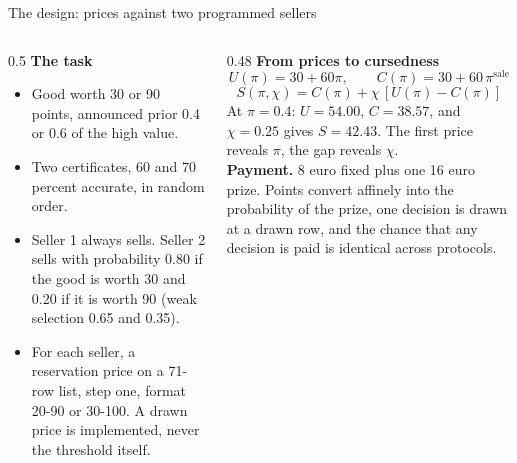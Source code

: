 \documentclass[aspectratio=169,11pt]{beamer}
\begin{document}
\begin{frame}{The design: prices against two programmed sellers}
\begin{columns}
\begin{column}{0.5\textwidth}
\textbf{The task}
\begin{itemize}
\item Good worth 30 or 90 points, announced prior 0.4 or 0.6 of the high value.
\item Two certificates, 60 and 70 percent accurate, in random order.
\item Seller 1 always sells. Seller 2 sells with probability 0.80 if the good is worth 30 and 0.20 if it is worth 90 (weak selection 0.65 and 0.35).
\item For each seller, a reservation price on a 71-row list, step one, format 20-90 or 30-100. A drawn price is implemented, never the threshold itself.
\end{itemize}
\end{column}
\begin{column}{0.48\textwidth}
\textbf{From prices to cursedness}
\[
U(\pi)=30+60\pi,\qquad C(\pi)=30+60\,\pi^{\text{sale}}
\]
\[
S(\pi,\chi)=C(\pi)+\chi\,[U(\pi)-C(\pi)]
\]
At $\pi=0.4$: $U=54.00$, $C=38.57$, and $\chi=0.25$ gives $S=42.43$. The first price reveals $\pi$, the gap reveals $\chi$.\\[4pt]
\textbf{Payment.} 8 euro fixed plus one 16 euro prize. Points convert affinely into the probability of the prize, one decision is drawn at a drawn row, and the chance that any decision is paid is identical across protocols.
\end{column}
\end{columns}
\end{frame}
\end{document}
